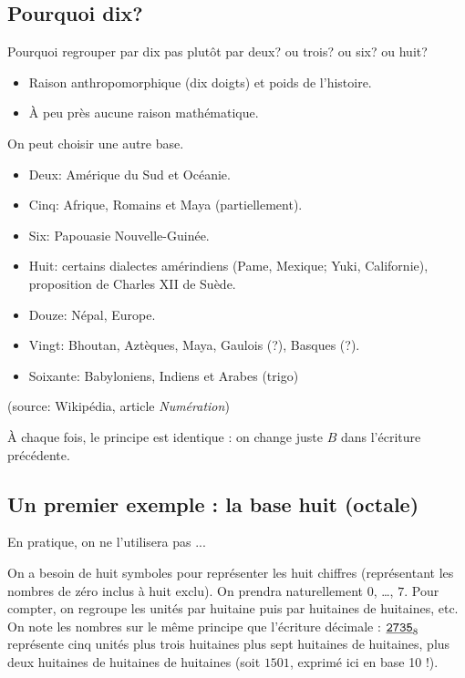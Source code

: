 \subsection{Pourquoi dix?}

Pourquoi regrouper par dix pas plutôt par deux? ou trois? ou six? ou
huit?

\begin{itemize}
\item Raison anthropomorphique (dix doigts) et poids de l'histoire.
\item À peu près aucune raison mathématique.
\end{itemize}

On peut choisir une autre base.

\begin{itemize}
\item Deux: Amérique du Sud et Océanie.
\item Cinq: Afrique, Romains et Maya (partiellement).
\item Six: Papouasie Nouvelle-Guinée.
\item Huit: certains dialectes amérindiens (Pame, Mexique; Yuki,
  Californie), proposition de Charles XII de Suède.
\item Douze: Népal, Europe.
\item Vingt: Bhoutan, Aztèques, Maya, Gaulois (?), Basques (?).
\item Soixante: Babyloniens, Indiens et Arabes (trigo)
\end{itemize}
(source: Wikipédia, article \textit{Numération})

\`A chaque fois, le principe est identique : on change juste $B$ dans l'écriture précédente.

\subsection{Un premier exemple : la base huit (octale)}

En pratique, on ne l'utilisera pas ...

On a besoin de huit symboles pour représenter les huit chiffres (représentant les nombres de zéro inclus à huit exclu). On prendra naturellement $0$, \ldots{}, $7$.
Pour compter, on regroupe les unités par huitaine puis par
  huitaines de huitaines, etc. On note les nombres sur le même principe que l'écriture décimale :
$\underline{\text{\texttt{2735}}}_{8}$ représente cinq unités plus trois huitaines
plus sept huitaines de huitaines, plus deux huitaines de huitaines de
huitaines (soit $1501$, exprimé ici en base 10 !).

